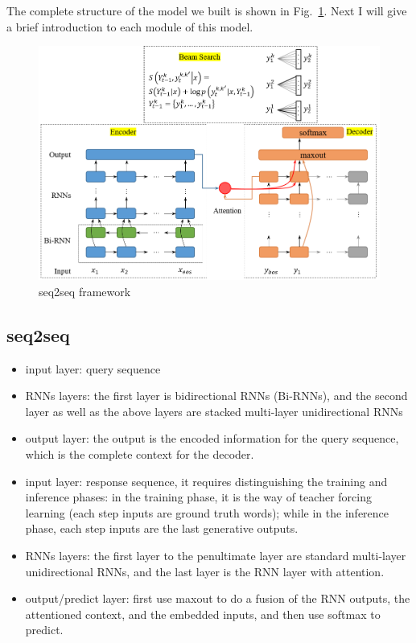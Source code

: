 \documentclass[12pt,a4paper]{article}
\begin{document}
The complete structure of the model we built is shown in Fig.~\ref{fig:arch}. Next I will give a brief introduction to each module of this model.
\begin{figure}[!ht]
  \centering
  \includegraphics[width=0.96\linewidth]{./figures/seq2seq_beamsearch.png}
  \caption{seq2seq framework}\label{fig:arch}
\end{figure}


\subsection{seq2seq}

\begin{itemize}
  \item input layer: query sequence
  \item RNNs layers: the first layer is bidirectional RNNs (Bi-RNNs), and the second layer as well as the above layers are stacked multi-layer unidirectional RNNs
  \item output layer: the output is the encoded information for the query sequence, which is the complete context for the decoder.
\end{itemize}

\begin{itemize}
  \item input layer: response sequence, it requires distinguishing the training and inference phases: in the training phase, it is the way of teacher forcing learning (each step inputs are ground truth words); while in the inference phase, each step inputs are the last generative outputs.
  \item RNNs layers: the first layer to the penultimate layer are standard multi-layer unidirectional RNNs, and the last layer is the RNN layer with attention.
  \item output/predict layer: first use maxout to do a fusion of the RNN outputs, the attentioned context, and the embedded inputs, and then use softmax to predict.
\end{itemize}
\end{document}
